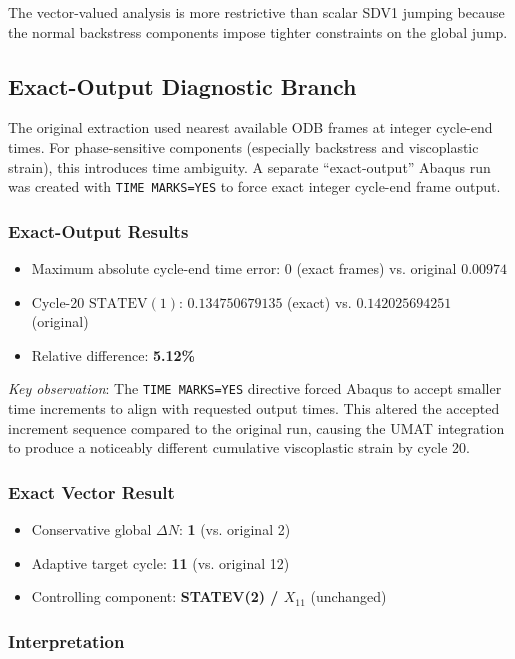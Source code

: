 The vector-valued analysis is more restrictive than scalar SDV1 jumping because the normal backstress components impose tighter constraints on the global jump.

\subsection{Exact-Output Diagnostic Branch}

The original extraction used nearest available ODB frames at integer cycle-end times. For phase-sensitive components (especially backstress and viscoplastic strain), this introduces time ambiguity. A separate ``exact-output'' Abaqus run was created with \texttt{TIME MARKS=YES} to force exact integer cycle-end frame output.

\subsubsection{Exact-Output Results}
\begin{itemize}
  \item Maximum absolute cycle-end time error: $0$ (exact frames) vs. original $0.00974$
  \item Cycle-20 $\text{STATEV}(1)$: $0.134750679135$ (exact) vs. $0.142025694251$ (original)
  \item Relative difference: \textbf{5.12\%}
\end{itemize}

\textit{Key observation}: The \texttt{TIME MARKS=YES} directive forced Abaqus to accept smaller time increments to align with requested output times. This altered the accepted increment sequence compared to the original run, causing the UMAT integration to produce a noticeably different cumulative viscoplastic strain by cycle 20.

\subsubsection{Exact Vector Result}
\begin{itemize}
  \item Conservative global $\Delta N$: \textbf{1} (vs. original 2)
  \item Adaptive target cycle: \textbf{11} (vs. original 12)
  \item Controlling component: \textbf{STATEV(2) / $X_{11}$} (unchanged)
\end{itemize}

\subsubsection{Interpretation}

